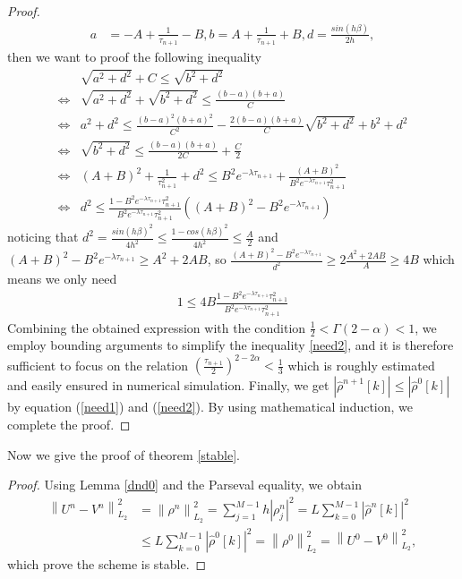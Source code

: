 \documentclass[10pt, reqno]{amsart}
\theoremstyle{remark}
\theoremstyle{definition}
\numberwithin{table}{section}
\begin{document}
\begin{proof}
\begin{align*}
a&=-A+\frac{1}{\tau_{n+1}}-B,b=A+\frac{1}{\tau_{n+1}}+B,d=\frac{sin(h\beta)}{2h},
\end{align*}
then we want to proof the following inequality
\begin{align*}
&\sqrt{a^2+d^2}+C\leq\sqrt{b^2+d^2}\\
\iff&\sqrt{a^2+d^2}+\sqrt{b^2+d^2}\leq \frac{(b-a)(b+a)}{C}\\
\iff&a^2+d^2\leq \frac{(b-a)^2(b+a)^2}{C^2}-\frac{2(b-a)(b+a)}{C}\sqrt{b^2+d^2}+b^2+d^2\\
\iff&\sqrt{b^2+d^2}\leq \frac{(b-a)(b+a)}{2C}+\frac{C}{2}\\
\iff&(A+B)^2+\frac{1}{\tau_{n+1}^2}+d^2\leq B^2e^{-\lambda\tau_{n+1}}+\frac{(A+B)^2}{B^2e^{-\lambda\tau_{n+1}}\tau_{n+1}^2}\\
\iff&d^2\leq \frac{1-B^2e^{-\lambda\tau_{n+1}}\tau_{n+1}^2}{B^2e^{-\lambda\tau_{n+1}}\tau_{n+1}^2}((A+B)^2-B^2e^{-\lambda\tau_{n+1}})
\end{align*}
noticing that $d^2 = \frac{sin(h\beta)^2}{4h^2}\leq \frac{1-cos(h\beta)^2}{4h^2}\leq \frac{A}{2}$ and $(A+B)^2-B^2e^{-\lambda\tau_{n+1}}\geq A^2+2AB$, so $\frac{(A+B)^2-B^2e^{-\lambda\tau_{n+1}}}{d^2}\geq 2\frac{A^2+2AB}{A}\geq 4B$ which means we only need
\begin{align}
    1\leq 4B\frac{1-B^2e^{-\lambda\tau_{n+1}}\tau_{n+1}^2}{B^2e^{-\lambda\tau_{n+1}}\tau_{n+1}^2}\label{need2}
\end{align}
Combining the obtained expression with the condition $\frac{1}{2}<\Gamma(2-\alpha)<1$, we employ bounding arguments to simplify the inequality \ref{need2}, and it is therefore sufficient to focus on the relation $(\frac{\tau_{n+1}}{2})^{2-2\alpha}<\frac{1}{3}$ which is roughly estimated and easily ensured in numerical simulation. Finally, we get $|\hat{\rho}^{n+1}[k]|\leq |\hat{\rho}^{0}[k]|$ by equation (\ref{need1}) and (\ref{need2}).  By using mathematical induction,  we complete the proof. 
\end{proof}
Now we give the proof of theorem \ref{stable}. 
\begin{proof}
    Using Lemma \ref{dnd0} and the Parseval equality,  we obtain
    \begin{equation}
\begin{aligned}
\left\|U^n-V^n\right\|_{L_2}^2 & =\left\|\rho^n\right\|_{L_2}^2=\sum_{j=1}^{M-1} h\left|\rho_j^n\right|^2=L\sum_{k=0}^{M-1}|\hat{\rho}^n[k]|^2 \\
& \leq L\sum_{k=0}^{M-1}|\hat{\rho}^0[k]|^2=\left\|\rho^0\right\|_{L_2}^2=\left\|U^0-V^0\right\|_{L_2}^2, 
\end{aligned}
\end{equation}
which prove the scheme is stable. 
\end{proof}
\end{document}
